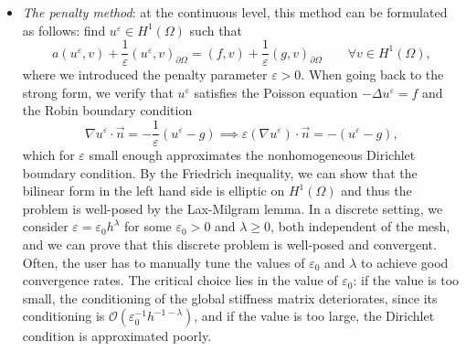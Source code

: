 \begin{itemize}
    \item \emph{The penalty method}: at the continuous level, this method can be formulated as follows: find $u^\varepsilon\in H^1(\Omega)$ such that 
    \begin{equation}
        a(u^\varepsilon, v) + \frac{1}{\varepsilon} (u^\varepsilon, v)_{\partial\Omega} = (f,v) + \frac{1}{\varepsilon} (g,v)_{\partial\Omega} \qquad \forall v\in H^1(\Omega),
    \end{equation}
    where we introduced the penalty parameter $\varepsilon>0$. When going back to the strong form, we verify that $u^\varepsilon$ satisfies the Poisson equation $-\Delta u^\varepsilon = f$ and the Robin boundary condition 
    \begin{equation}
        \nabla u^\varepsilon \cdot\vec n = -\frac{1}{\varepsilon}(u^\varepsilon - g) \implies \varepsilon (\nabla u^\varepsilon) \cdot \vec n = -(u^\varepsilon - g),
    \end{equation}
    which for $\varepsilon$ small enough approximates the nonhomogeneous Dirichlet boundary condition. By the Friedrich inequality, we can show that the bilinear form in the left hand side is elliptic on $H^1(\Omega)$ and thus the problem is well-posed by the Lax-Milgram lemma. In a discrete setting, we consider $\varepsilon = \varepsilon_0 h^\lambda$ for some $\varepsilon_0 > 0$ and $\lambda\geq 0$, both independent of the mesh, and we can prove that this discrete problem is well-posed and convergent. Often, the user has to manually tune the values of $\varepsilon_0$ and $\lambda$ to achieve good convergence rates. The critical choice lies in the value of $\varepsilon_0$: if the value is too small, the conditioning of the global stiffness matrix deteriorates, since its conditioning is $\mathcal{O}(\varepsilon_0^{-1}h^{-1-\lambda})$, and if the value is too large, the Dirichlet condition is approximated poorly. 


\end{itemize}
